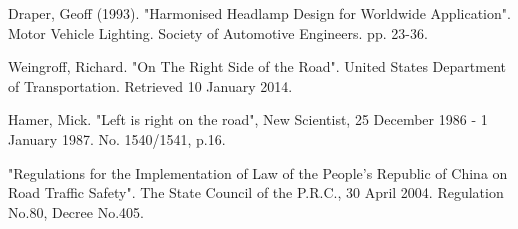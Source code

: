 \begin{thebibliography}{99}

 Draper, Geoff (1993). "Harmonised 
Headlamp Design for Worldwide Application". Motor Vehicle 
Lighting. Society of Automotive Engineers. pp. 23-36.

 Weingroff, Richard. "On The 
Right Side of the Road". United States Department of 
Transportation. Retrieved 10 January 2014.

 Hamer, Mick. "Left is right on the 
road", New Scientist, 25 December 1986 - 1 January 1987. No.
1540/1541, p.16.

 "Regulations for the Implementation of Law of the People's Republic of China on 
Road Traffic Safety". The State Council of the P.R.C., 30 
April 2004. Regulation No.80, Decree No.405.

\end{thebibliography}
